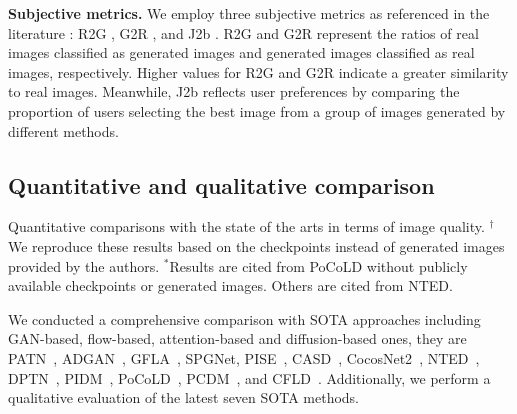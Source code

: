 \textbf{Subjective metrics.}
We employ three subjective metrics as referenced in the literature \cite{bhunia2023person}: R2G \cite{ma2017pose}, G2R \cite{ma2017pose}, and J2b \cite{siarohin2018deformable,bhunia2023person}.
%
R2G and G2R represent the ratios of real images classified as generated images and generated images classified as real images, respectively. Higher values for R2G and G2R indicate a greater similarity to real images. Meanwhile, J2b reflects user preferences by comparing the proportion of users selecting the best image from a group of images generated by different methods.



\subsection{Quantitative and qualitative comparison}
\label{subsec:quantitative and qualitative comparison}
%
\begin{table*}[t!]
    \centering
    \caption{Quantitative comparisons with the state of the arts in terms of image quality. $^\dagger$We reproduce these results based on the checkpoints instead of generated images provided by the authors. $^\ast$Results are cited from PoCoLD without publicly available checkpoints or generated images. Others are cited from NTED.}
    \label{tab:main_experiment}
    \resizebox{1\linewidth}{!}{
    
    }
\end{table*}
%
We conducted a comprehensive comparison with SOTA approaches including GAN-based, flow-based, attention-based and diffusion-based ones, they are PATN~\cite{zhu2019progressive}, ADGAN~\cite{men2020controllable}, GFLA~\cite{ren2020deep}, 
SPGNet\cite{lv2021learning},
PISE~\cite{zhang2021pise}, CASD~\cite{zhou2022cross}, CocosNet2~\cite{zhou2021cocosnet}, NTED~\cite{ren2022neural}, DPTN~\cite{zhang2022exploring}, PIDM~\cite{bhunia2023person}, PoCoLD~\cite{han2023controllable}, PCDM~\cite{shen2024advancing}, and CFLD~\cite{lu2024coarse}. 
Additionally, we perform a qualitative evaluation of the latest seven SOTA methods.

